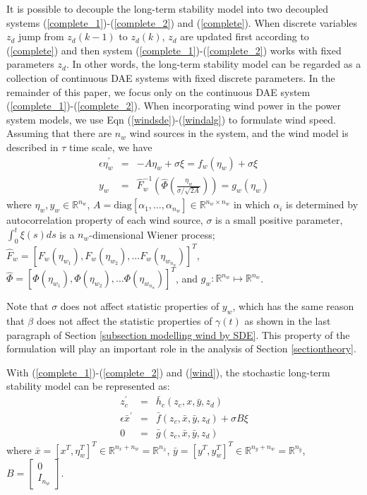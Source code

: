 \documentclass[journal]{IEEEtran}
\newcommand{\ee}{\epsilon}
\begin{document}
It is possible to decouple the long-term stability model into two decoupled systems (\ref{complete_1})-(\ref{complete_2}) and (\ref{complete}). When discrete variables $z_d$ jump from $z_d(k-1)$ to $z_d(k)$,
$z_d$ are updated first according to (\ref{complete}) and then system (\ref{complete_1})-(\ref{complete_2}) works with fixed parameters $z_d$. In other words, the long-term stability model can be regarded as a collection of continuous DAE systems with fixed discrete parameters. In the remainder of this paper, we focus only on the continuous DAE system (\ref{complete_1})-(\ref{complete_2}). 
When incorporating wind power in the power system models, we use Eqn (\ref{windsde})-(\ref{windalg}) to formulate wind speed. Assuming that there are $n_w$ wind sources in the system, and the wind model is described in $\tau$ time scale, we have
\begin{eqnarray}
\ee\eta_w^\prime&=&-A\eta_w+\sigma\xi=f_w(\eta_w)+\sigma\xi\label{wind}\\
y_w&=&\hat{F}_w^{-1}(\hat{\Phi}(\frac{\eta_w}{\sigma/\sqrt{2A}}))=g_w(\eta_w)\nonumber
\end{eqnarray}
where $\eta_w, y_w \in \mathbb{R}^{n_w}$, $A=\mbox{diag}[\alpha_1,\ldots,\alpha_{n_w}]\in \mathbb{R}^{{n_w}\times{n_w}}$ in which $\alpha_i$ is determined by autocorrelation property of each wind source, $\sigma$ is a small positive parameter, $\int_0^{t}\xi(s)ds$ is a $n_w$-dimensional Wiener process; $\hat{F}_w=[F_w(\eta_{w_1}), F_w(\eta_{w_2}),...F_w(\eta_{w_{n_w}})]^T$, $\hat{\Phi}=[\Phi(\eta_{w_1}),\Phi(\eta_{w_2}),...\Phi(\eta_{w_{n_w}})]^T$, and $g_w:\mathbb{R}^{n_w}\mapsto\mathbb{R}^{n_w}$.

Note that $\sigma$ does not affect statistic properties of $y_w$, which has the same reason that $\beta$ does not affect the statistic properties of $\gamma(t)$ as shown in the last paragraph of Section \ref{subsection modelling wind by SDE}. This property of the formulation will play an important role in the  analysis of Section \ref{sectiontheory}. 

With (\ref{complete_1})-(\ref{complete_2}) and (\ref{wind}), the stochastic long-term stability model can be represented as:
\begin{eqnarray}
{z}_{c}^\prime&=&\bar{h}_c({z_c,x,\bar{y},z_d})\label{sto_cont}\\
\ee{\bar{x}}^\prime&=&\bar{f}({z_c,\bar{x},\bar{y},z_d})+\sigma B {\xi}\nonumber\\
{0}&=&\bar{g}({z_c,\bar{x},\bar{y},z_d})\nonumber
\end{eqnarray}
where $\bar{x}=[x^T,\eta_w^T]^T\in \mathbb{R}^{n_x+n_w}=\mathbb{R}^{n_{\bar{x}}}$, $\bar{y}=[y^T,y_w^T]^T\in \mathbb{R}^{n_y+n_w}=\mathbb{R}^{n_{\bar{y}}}$,
$B=\left[\begin{smallmatrix}0\\I_{n_w}\end{smallmatrix}\right]$.
\end{document}
